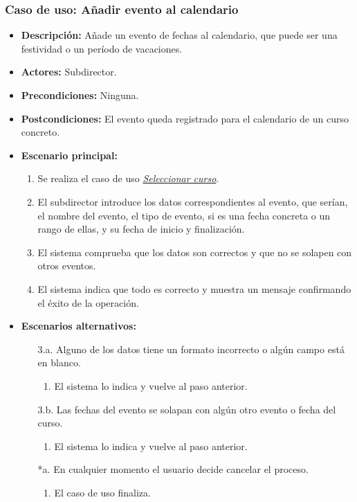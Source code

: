 \subsubsection*{Caso de uso: Añadir evento al calendario}
\begin{itemize}
\item{\bf Descripción:} Añade un evento de fechas al calendario, que puede ser una festividad o un período de vacaciones.
\item{\bf Actores:} Subdirector.
\item{\bf Precondiciones:} Ninguna.
\item{\bf Postcondiciones:} El evento queda registrado para el calendario de un curso concreto.
\item{\bf Escenario principal:}
	\begin{enumerate}
	\item Se realiza el caso de uso {\em \hyperref[select_curso]{Seleccionar curso}}.
	\item El subdirector introduce los datos correspondientes al evento, que serían, el nombre del evento, el tipo de evento, si es una fecha concreta o un rango de ellas, y su fecha de inicio y finalización.
	\item El sistema comprueba que los datos son correctos y que no se solapen con otros eventos.
	\item El sistema indica que todo es correcto y muestra un mensaje confirmando el éxito de la operación.
	\end{enumerate}
\item{\bf Escenarios alternativos:}
	\begin{itemize}
		\item[3.a.] Alguno de los datos tiene un formato incorrecto o algún campo está en blanco.
		\begin{enumerate}
			\item El sistema lo indica y vuelve al paso anterior.
		\end{enumerate}
		\item[3.b.] Las fechas del evento se solapan con algún otro evento o fecha del curso.
		\begin{enumerate}
			\item El sistema lo indica y vuelve al paso anterior.
		\end{enumerate}
		\item[*a.] En cualquier momento el usuario decide cancelar el proceso.
		\begin{enumerate}
		\item El caso de uso finaliza.
		\end{enumerate}
	\end{itemize}
\end{itemize}



